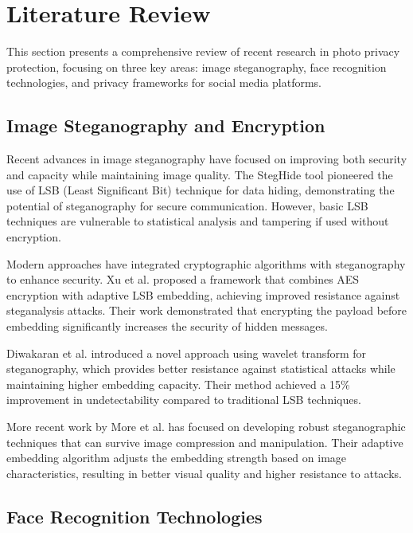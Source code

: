 \documentclass[pdflatex,sn-mathphys-num]{sn-jnl}%
\theoremstyle{thmstyleone}%
\theoremstyle{thmstyletwo}%
\theoremstyle{thmstylethree}%
\begin{document}
\section{Literature Review}\label{sec2}

This section presents a comprehensive review of recent research in photo privacy protection, focusing on three key areas: image steganography, face recognition technologies, and privacy frameworks for social media platforms.

\subsection{Image Steganography and Encryption}

Recent advances in image steganography have focused on improving both security and capacity while maintaining image quality. The StegHide tool \cite{stegHide} pioneered the use of LSB (Least Significant Bit) technique for data hiding, demonstrating the potential of steganography for secure communication. However, basic LSB techniques are vulnerable to statistical analysis and tampering if used without encryption.

Modern approaches have integrated cryptographic algorithms with steganography to enhance security. Xu et al. \cite{xu2015privacy} proposed a framework that combines AES encryption with adaptive LSB embedding, achieving improved resistance against steganalysis attacks. Their work demonstrated that encrypting the payload before embedding significantly increases the security of hidden messages.

Diwakaran et al. \cite{diwakaran2019privacy} introduced a novel approach using wavelet transform for steganography, which provides better resistance against statistical attacks while maintaining higher embedding capacity. Their method achieved a 15\% improvement in undetectability compared to traditional LSB techniques.

More recent work by More et al. \cite{more2020privacy} has focused on developing robust steganographic techniques that can survive image compression and manipulation. Their adaptive embedding algorithm adjusts the embedding strength based on image characteristics, resulting in better visual quality and higher resistance to attacks.

\subsection{Face Recognition Technologies}
\end{document}
